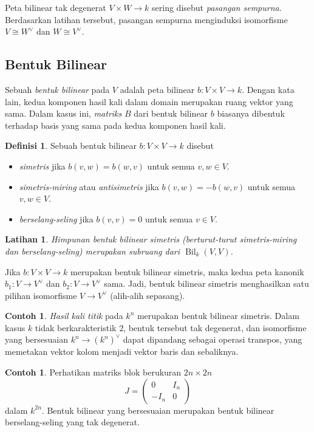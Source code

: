 \documentclass[12pt]{article}
\theoremstyle{plain}
\newtheorem{exercise}[theorem]{Latihan}
\theoremstyle{definition}
\newtheorem{definition}[theorem]{Definisi}
\newtheorem{example}[theorem]{Contoh}
\theoremstyle{remark}
\numberwithin{equation}{section}
\begin{document}
Peta bilinear tak degenerat $V \times W \to k$ sering disebut
\emph{pasangan sempurna}. Berdasarkan latihan tersebut, pasangan sempurna
menginduksi isomorfisme $V \cong W^\vee$ dan $W \cong V^\vee$.

\subsection{Bentuk Bilinear}

Sebuah \emph{bentuk bilinear} pada $V$ adalah peta bilinear $b : V \times V \to k$.
Dengan kata lain, kedua komponen hasil kali dalam domain merupakan
ruang vektor yang sama.
Dalam kasus ini, \emph{matriks} $B$ dari bentuk bilinear $b$ biasanya dibentuk
terhadap basis yang sama pada kedua komponen hasil kali.

\begin{definition}
Sebuah bentuk bilinear $b: V \times V \to k$ disebut
\begin{itemize}
\item \emph{simetris} jika $b(v,w)=b(w,v)$ untuk semua $v,w \in V$.
\item \emph{simetris-miring} atau \emph{antisimetris}
jika $b(v,w)=-b(w,v)$ untuk semua $v,w \in V$.
\item \emph{berselang-seling} jika $b(v,v)=0$ untuk semua $v \in V$.
\end{itemize}
\end{definition}

\begin{exercise}
Himpunan bentuk bilinear simetris (berturut-turut simetris-miring dan
berselang-seling) merupakan subruang dari $\operatorname{Bil}_k(V,V)$.
\end{exercise}

Jika $b: V \times V \to k$ merupakan bentuk bilinear simetris,
maka kedua peta kanonik $b_1 : V \to V^\vee$ dan $b_2 : V \to
V^\vee$ sama. Jadi, bentuk bilinear simetris menghasilkan
satu pilihan isomorfisme $V \to V^\vee$ (alih-alih sepasang).

\begin{example}
\emph{Hasil kali titik} pada $k^n$ merupakan bentuk bilinear simetris.
Dalam kasus $k$ tidak berkarakteristik $2$, bentuk tersebut
tak degenerat, dan isomorfisme yang bersesuaian
$k^n \to (k^n)^\vee$ dapat dipandang sebagai operasi
transpos, yang memetakan vektor kolom menjadi vektor baris dan
sebaliknya.
\end{example}

\begin{example}
Perhatikan matriks blok berukuran $2n \times 2n$
\[
J = \begin{pmatrix} 0 & I_n \\ -I_n & 0 \end{pmatrix} 
\]
dalam $k^{2n}$.
Bentuk bilinear yang bersesuaian merupakan bentuk bilinear
berselang-seling yang tak degenerat.
\end{example}
\end{document}
